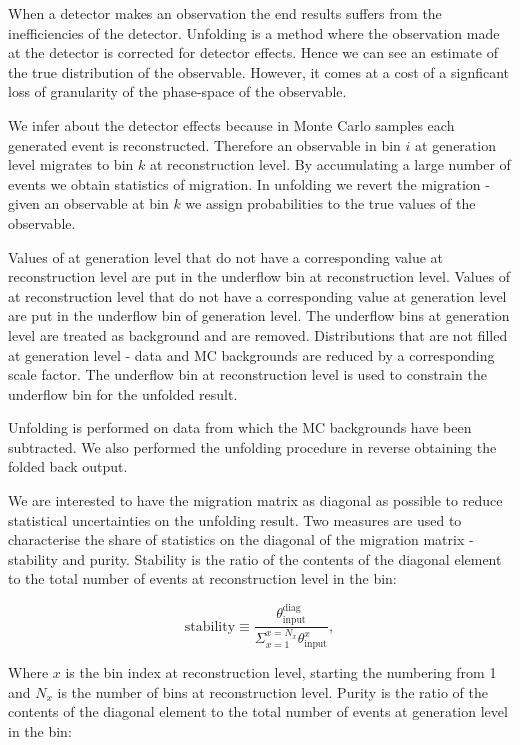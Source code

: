 When a detector makes an observation the end results suffers from the inefficiencies of the detector. Unfolding is a method where the observation made at the detector is corrected for detector effects. Hence we can see an estimate of the true distribution of the observable. However, it comes at a cost of a signficant loss of granularity of the phase-space of the observable.

We infer about the detector effects because in Monte Carlo samples each generated event is reconstructed. Therefore an observable in bin $i$ at generation level migrates to bin $k$ at reconstruction level. By accumulating a large number of events we obtain statistics of migration. In unfolding we revert the migration - given an observable at bin $k$ we assign probabilities to the true values of the observable.

Values of \pullangle at generation level that do not have a corresponding value at reconstruction level are put in the underflow bin at reconstruction level. Values of \pullangle at reconstruction level that do not have a corresponding value at generation level are put in the underflow bin of generation level. The underflow bins at generation level are treated as background and are removed. Distributions that are not filled at generation level - data and MC backgrounds are reduced by a corresponding scale factor. The underflow bin at reconstruction level is used to constrain the underflow bin for the unfolded result.

Unfolding is performed on data from which the MC backgrounds have been subtracted. We also performed the unfolding procedure in reverse obtaining the folded back output.

We are interested to have the migration matrix as diagonal as possible to reduce statistical uncertainties on the unfolding result. Two measures are used to characterise the share of statistics on the diagonal of the migration matrix - stability and purity. Stability is the ratio of the contents of the diagonal element to the total number of events at reconstruction level in the bin:

\begin{equation}
  \text{stability}\equiv\frac{\theta^{\text{diag}}_{\text{input}}}{\Sigma_{x=1}^{x=N_{x}}\theta^{x}_{\text{input}}},
\end{equation}

Where $x$ is the bin index at reconstruction level, starting the numbering from 1 and $N_{x}$ is the number of bins at reconstruction level. Purity is the ratio of the contents of the diagonal element to the total number of events at generation level in the bin:

